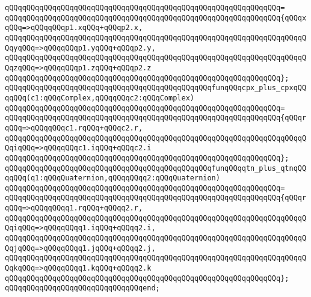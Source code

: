 \verb|qQQqqQQqqQQqqQQqqQQqqQQqqQQqqQQqqQQqqQQqqQQqqQQqqQQqqQQqqQQqqQQq=|\newline
\verb|qQQqqQQqqQQqqQQqqQQqqQQqqQQqqQQqqQQqqQQqqQQqqQQqqQQqqQQqqQQqqQQq{qQQqxqQQq=>qQQqqQQqp1.xqQQq+qQQqp2.x,|\newline
\verb|qQQqqQQqqQQqqQQqqQQqqQQqqQQqqQQqqQQqqQQqqQQqqQQqqQQqqQQqqQQqqQQqqQQqqQQqyqQQq=>qQQqqQQqp1.yqQQq+qQQqp2.y,|\newline
\verb|qQQqqQQqqQQqqQQqqQQqqQQqqQQqqQQqqQQqqQQqqQQqqQQqqQQqqQQqqQQqqQQqqQQqqQQqzqQQq=>qQQqqQQqp1.zqQQq+qQQqp2.z|\newline
\verb|qQQqqQQqqQQqqQQqqQQqqQQqqQQqqQQqqQQqqQQqqQQqqQQqqQQqqQQqqQQqqQQq};|\newline
\verb|qQQqqQQqqQQqqQQqqQQqqQQqqQQqqQQqqQQqqQQqqQQqqQQqfunqQQqcpx_plus_cpxqQQqqQQq(c1:qQQqComplex,qQQqqQQqc2:qQQqComplex)|\newline
\verb|qQQqqQQqqQQqqQQqqQQqqQQqqQQqqQQqqQQqqQQqqQQqqQQqqQQqqQQqqQQqqQQq=|\newline
\verb|qQQqqQQqqQQqqQQqqQQqqQQqqQQqqQQqqQQqqQQqqQQqqQQqqQQqqQQqqQQqqQQq{qQQqrqQQq=>qQQqqQQqc1.rqQQq+qQQqc2.r,|\newline
\verb|qQQqqQQqqQQqqQQqqQQqqQQqqQQqqQQqqQQqqQQqqQQqqQQqqQQqqQQqqQQqqQQqqQQqqQQqiqQQq=>qQQqqQQqc1.iqQQq+qQQqc2.i|\newline
\verb|qQQqqQQqqQQqqQQqqQQqqQQqqQQqqQQqqQQqqQQqqQQqqQQqqQQqqQQqqQQqqQQq};|\newline
\verb|qQQqqQQqqQQqqQQqqQQqqQQqqQQqqQQqqQQqqQQqqQQqqQQqfunqQQqqtn_plus_qtnqQQqqQQq(q1:qQQqQuaternion,qQQqqQQqq2:qQQqQuaternion)|\newline
\verb|qQQqqQQqqQQqqQQqqQQqqQQqqQQqqQQqqQQqqQQqqQQqqQQqqQQqqQQqqQQqqQQq=|\newline
\verb|qQQqqQQqqQQqqQQqqQQqqQQqqQQqqQQqqQQqqQQqqQQqqQQqqQQqqQQqqQQqqQQq{qQQqrqQQq=>qQQqqQQqq1.rqQQq+qQQqq2.r,|\newline
\verb|qQQqqQQqqQQqqQQqqQQqqQQqqQQqqQQqqQQqqQQqqQQqqQQqqQQqqQQqqQQqqQQqqQQqqQQqiqQQq=>qQQqqQQqq1.iqQQq+qQQqq2.i,|\newline
\verb|qQQqqQQqqQQqqQQqqQQqqQQqqQQqqQQqqQQqqQQqqQQqqQQqqQQqqQQqqQQqqQQqqQQqqQQqjqQQq=>qQQqqQQqq1.jqQQq+qQQqq2.j,|\newline
\verb|qQQqqQQqqQQqqQQqqQQqqQQqqQQqqQQqqQQqqQQqqQQqqQQqqQQqqQQqqQQqqQQqqQQqqQQqkqQQq=>qQQqqQQqq1.kqQQq+qQQqq2.k|\newline
\verb|qQQqqQQqqQQqqQQqqQQqqQQqqQQqqQQqqQQqqQQqqQQqqQQqqQQqqQQqqQQqqQQq};|\newline
\verb|qQQqqQQqqQQqqQQqqQQqqQQqqQQqqQQqend;|\newline
